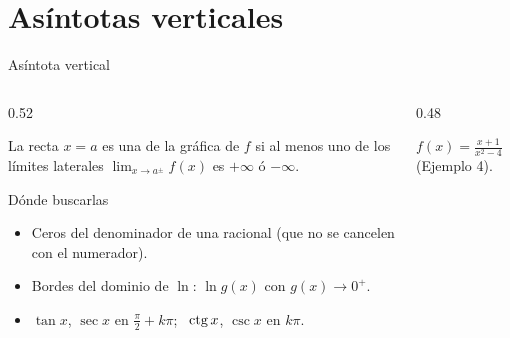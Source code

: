 \documentclass[10pt,aspectratio=169]{beamer}
\begin{document}
\section{Asíntotas verticales}

\begin{frame}{Asíntota vertical}
  \begin{columns}
    \begin{column}{0.52\textwidth}
      \begin{definicion}
        La recta $x=a$ es una  de la gráfica de $f$ si al menos uno de los límites laterales
        $\lim_{x\to a^\pm}f(x)$ es $+\infty$ ó $-\infty$.
      \end{definicion}
      \begin{block}{Dónde buscarlas}
        \begin{itemize}
          \item Ceros del denominador de una racional (que no se cancelen con el numerador).
          \item Bordes del dominio de $\ln$: $\ln g(x)$ con $g(x)\to0^+$.
          \item $\tan x$, $\sec x$ en $\frac\pi2+k\pi$; \ $\operatorname{ctg} x$, $\csc x$ en $k\pi$.
        \end{itemize}
      \end{block}
    \end{column}
    \begin{column}{0.48\textwidth}
      \centering

      \small $f(x)=\frac{x+1}{x^2-4}$ (Ejemplo 4).
    \end{column}
  \end{columns}
\end{frame}
\end{document}
